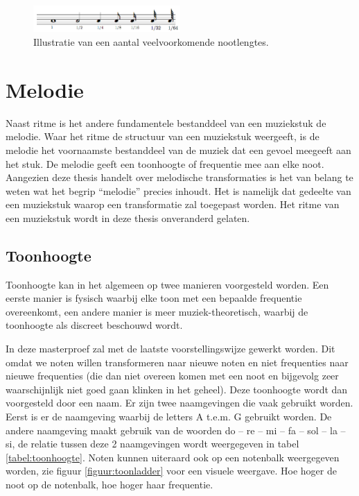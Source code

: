 \begin{figure}[!ht]
  \centering
  \includegraphics[width=0.5\textwidth]{1_Muzikale_Achtergrond/nootlengtes}
  \caption{Illustratie van een aantal veelvoorkomende nootlengtes.}
  \label{figuur:nootlengtes}
\end{figure}

\section{Melodie}
Naast ritme is het andere fundamentele bestanddeel van een muziekstuk de melodie. Waar het ritme de structuur van een muziekstuk weergeeft, is de melodie het voornaamste bestanddeel van de muziek dat een gevoel meegeeft aan het stuk. De melodie geeft een toonhoogte of frequentie mee aan elke noot. Aangezien deze thesis handelt over melodische transformaties is het van belang te weten wat het begrip ``melodie'' precies inhoudt. Het is namelijk dat gedeelte van een muziekstuk waarop een transformatie zal toegepast worden. Het ritme van een muziekstuk wordt in deze thesis onveranderd gelaten.

\subsection{Toonhoogte}
Toonhoogte kan in het algemeen op twee manieren voorgesteld worden. Een eerste manier is fysisch waarbij elke toon met een bepaalde frequentie overeenkomt, een andere manier is meer muziek-theoretisch, waarbij de toonhoogte als discreet beschouwd wordt. 

In deze masterproef zal met de laatste voorstellingswijze gewerkt worden. Dit omdat we noten willen transformeren naar nieuwe noten en niet frequenties naar nieuwe frequenties (die dan niet overeen komen met een noot en bijgevolg zeer waarschijnlijk niet goed gaan klinken in het geheel). Deze toonhoogte wordt dan voorgesteld door een naam. Er zijn twee naamgevingen die vaak gebruikt worden. Eerst is er de naamgeving waarbij de letters A t.e.m. G gebruikt worden. De andere naamgeving maakt gebruik van de woorden do -- re -- mi -- fa -- sol -- la -- si, de relatie tussen deze 2 naamgevingen wordt weergegeven in tabel \ref{tabel:toonhoogte}. Noten kunnen uiteraard ook op een notenbalk weergegeven worden, zie figuur \ref{figuur:toonladder} voor een visuele weergave. Hoe hoger de noot op de notenbalk, hoe hoger haar frequentie.

